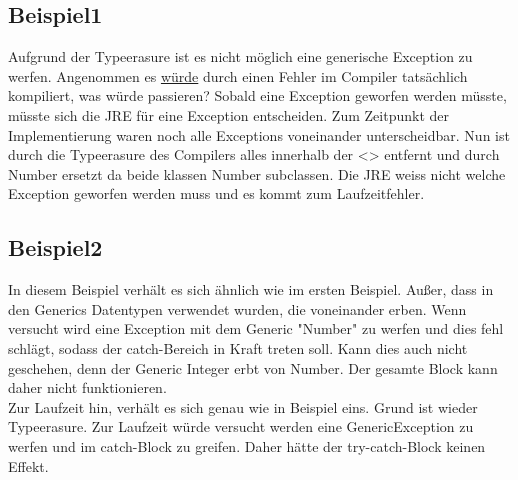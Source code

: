 \documentclass[12pt,a4paper,oneside,ngerman]{article}
\begin{document}
\subsection*{Beispiel1}
Aufgrund der Typeerasure ist es nicht möglich eine generische Exception zu werfen. Angenommen es \underline{würde}  durch einen Fehler im Compiler tatsächlich kompiliert, was würde passieren? Sobald eine Exception geworfen werden müsste, müsste sich die JRE für eine Exception entscheiden. Zum Zeitpunkt der Implementierung waren noch alle Exceptions voneinander unterscheidbar. Nun ist durch die Typeerasure des Compilers alles innerhalb der <> entfernt und durch Number ersetzt da beide klassen Number subclassen. Die JRE weiss nicht welche Exception geworfen werden muss und es kommt zum Laufzeitfehler.
\newpage
\subsection*{Beispiel2}
In diesem Beispiel verhält es sich ähnlich wie im ersten Beispiel. Außer, dass in den Generics Datentypen verwendet wurden, die voneinander erben. Wenn versucht wird eine Exception mit dem Generic "Number" zu werfen und dies fehl schlägt, sodass der catch-Bereich in Kraft treten soll. Kann dies auch nicht geschehen, denn der Generic Integer erbt von Number. Der gesamte Block kann daher nicht funktionieren.\\
Zur Laufzeit hin, verhält es sich genau wie in Beispiel eins. Grund ist wieder Typeerasure. Zur Laufzeit würde versucht werden eine GenericException zu werfen und im catch-Block zu greifen. Daher hätte der try-catch-Block keinen Effekt.

\end{document}
